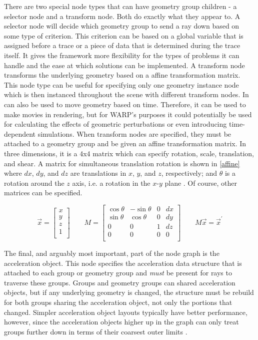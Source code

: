There are two special node types that can have geometry group children - a selector node and a transform node.  Both do exactly what they appear to.  A selector node will decide which geometry group to send a ray down based on some type of criterion.  This criterion can be based on a  global variable that is assigned before a trace or a piece of data that is determined during the trace itself.  It gives the framework more flexibility for the types of problems it can handle and the ease at which solutions can be implemented.  A transform node transforms the underlying geometry based on a affine transformation matrix.  This node type can be useful for specifying only one geometry instance node which is then instanced throughout the scene with different transform nodes.  In can also be used to move geometry based on time.  Therefore, it can be used to make movies in rendering, but for WARP's purposes it could potentially be used for calculating the effects of geometric perturbations or even introducing time-dependent simulations.  When transform nodes are specified, they must be attached to a geometry group and be given an affine transformation matrix.  In three dimensions, it is a 4x4 matrix which can specify rotation, scale, translation, and shear.  A matrix for simultaneous translation rotation is shown in \eqref{affine} where $dx$, $dy$, and $dz$ are translations in $x$, $y$, and $z$, respectively; and $\theta$ is a rotation around the $z$ axis, i.e. a rotation in the $x$-$y$ plane \cite{affine}.  Of course, other matrices can be specified.

\begin{equation}
\label{affine}
\vec{x} = \left[ \begin{array}{c}
x \\
y\\
z\\
1 \\ \end{array} 
 \right] \qquad
M = \left[ \begin{array}{cccc}
\cos \theta & -\sin \theta & 0 & dx \\
\sin \theta & \cos \theta & 0 &  dy\\
0 & 0 & 1 & dz\\
0 & 0 & 0 & 0\\
\end{array} \right]  \qquad
M \vec{x} = \vec{x}^\prime
\end{equation}

The final, and arguably most important, part of the node graph is the acceleration object.  This node specifies the acceleration data structure that is attached to each group or geometry group and \emph{must} be present for rays to traverse these groups.  Groups and geometry groups can shared acceleration objects, but if any underlying geometry is changed, the structure must be rebuild for both groups sharing the acceleration object, not only the portions that changed.  Simpler acceleration object layouts typically have better performance, however, since the acceleration objects higher up in the graph can only treat groups further down in terms of their coarsest outer limits \cite{optix}.

